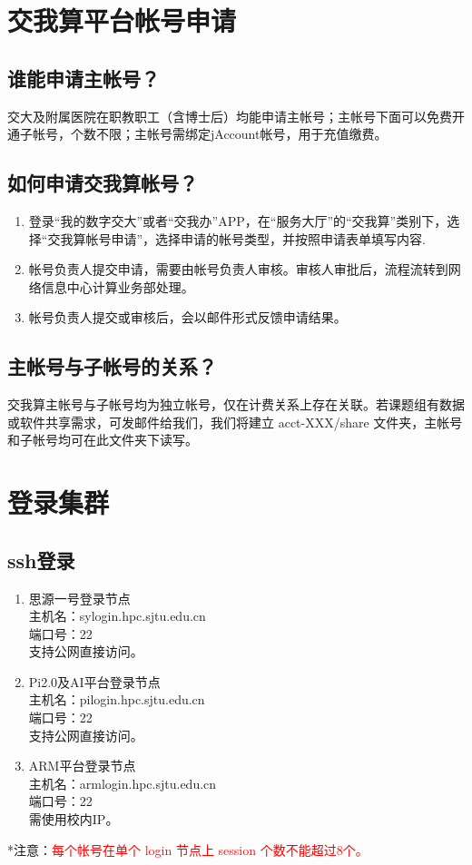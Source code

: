\documentclass[cn, 12pt, hang, black, chinese]{elegantbook}
\begin{document}
\section{交我算平台帐号申请}

\subsection*{谁能申请主帐号？}
交大及附属医院在职教职工（含博士后）均能申请主帐号；主帐号下面可以免费开通子帐号，个数不限；主帐号需绑定jAccount帐号，用于充值缴费。

\subsection*{如何申请交我算帐号？}
\begin{enumerate}
\item 登录“我的数字交大”或者“交我办”APP，在“服务大厅”的“交我算”类别下，选择“交我算帐号申请”，选择申请的帐号类型，并按照申请表单填写内容.
\item 帐号负责人提交申请，需要由帐号负责人审核。审核人审批后，流程流转到网络信息中心计算业务部处理。
\item 帐号负责人提交或审核后，会以邮件形式反馈申请结果。
\end{enumerate}

\subsection*{主帐号与子帐号的关系？}
交我算主帐号与子帐号均为独立帐号，仅在计费关系上存在关联。若课题组有数据或软件共享需求，可发邮件给我们，我们将建立 acct-XXX/share 文件夹，主帐号和子帐号均可在此文件夹下读写。

\section{登录集群}

\subsection*{ssh登录}
\begin{enumerate}
\item 思源一号登录节点\\主机名：sylogin.hpc.sjtu.edu.cn\\端口号：22\\支持公网直接访问。
\item Pi2.0及AI平台登录节点\\主机名：pilogin.hpc.sjtu.edu.cn\\端口号：22\\支持公网直接访问。
\item ARM平台登录节点\\主机名：armlogin.hpc.sjtu.edu.cn\\端口号：22\\需使用校内IP。
\end{enumerate}
*注意：\textcolor{red}{每个帐号在单个 login 节点上 session 个数不能超过8个。}
\end{document}
